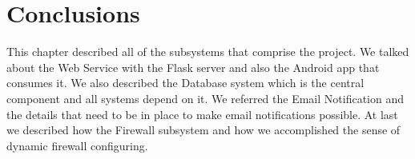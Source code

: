 
\section{Conclusions}
\label{chap4:sec:concs}
This chapter described all of the subsystems that comprise the project. We
talked about the Web Service with the Flask server and also the Android app that
consumes it. We also described the Database system which is the central
component and all systems depend on it. We referred the Email Notification and
the details that need to be in place to make email notifications possible. At
last we described how the Firewall subsystem and how we accomplished the sense
of dynamic firewall configuring.

